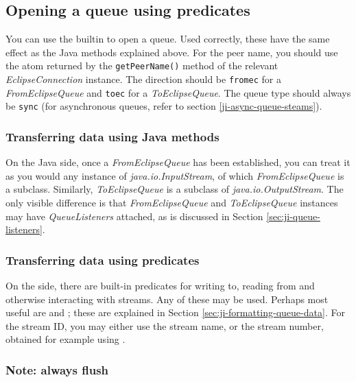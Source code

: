 \subsection*{Opening a queue using {\eclipse} predicates}
You can use the {\eclipse} builtin  to open a
queue. Used correctly, these have the same effect as the Java methods
explained above. For the peer name, you should use the atom returned
by the {\tt getPeerName()} method of the relevant {\it
EclipseConnection} instance. The direction should be {\tt fromec} for
a {\it FromEclipseQueue} and {\tt toec} for a {\it
ToEclipseQueue}. The queue type should always be {\tt sync}
(for asynchronous queues, refer to section \ref{ji-async-queue-steams}).

\subsubsection*{Transferring data using Java methods}

On the Java side, once a {\it FromEclipseQueue} has been established,
you can treat it as you would any instance of {\it
java.io.InputStream}, of which {\it FromEclipseQueue} is a
subclass. Similarly, {\it ToEclipseQueue} is a subclass of {\it
java.io.OutputStream}. The only visible difference is that {\it
FromEclipseQueue} and {\it ToEclipseQueue} instances may have {\it
QueueListeners} attached, as is discussed in Section
\ref{sec:ji-queue-listeners}. 

\subsubsection*{Transferring data using {\eclipse} predicates}

On the {\eclipse} side, there are built-in predicates for writing to,
reading from and otherwise interacting with streams. Any of these may
be used. Perhaps most useful are  and ; these are explained in Section
\ref{sec:ji-formatting-queue-data}. For the stream ID, you may either use the stream name, or the stream number, obtained for example using .

\subsubsection*{Note: {\bf always} flush}

